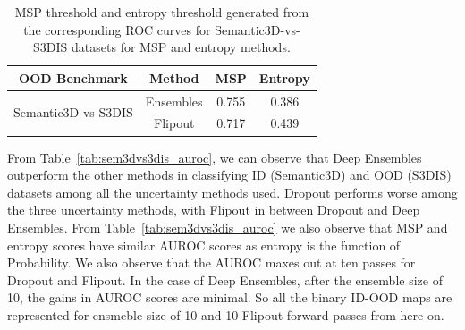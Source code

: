     \begin{table}[h!]
        \centering
        \begin{tabular}{cccc}
            \hline
            OOD Benchmark                                           & Method    & MSP   & Entropy \\ \hline
            \multirow{2}{*}{Semantic3D-vs-S3DIS}                    & Ensembles & 0.755 & 0.386   \\
                                                                    & Flipout   & 0.717 & 0.439   \\ \hline
        \end{tabular}
        \caption{MSP threshold and entropy threshold generated from the corresponding ROC curves for Semantic3D-vs-S3DIS datasets for MSP and entropy methods.}
        \label{tab:thresholds}
    \end{table}
    From Table~\ref{tab:sem3dvs3dis_auroc}, we can observe that Deep Ensembles outperform the other methods in classifying ID (Semantic3D) and OOD (S3DIS) datasets among all the uncertainty methods used.
    Dropout performs worse among the three uncertainty methods, with Flipout in between Dropout and Deep Ensembles.
    From Table~\ref{tab:sem3dvs3dis_auroc} we also observe that MSP and entropy scores have similar AUROC scores as entropy is the function of Probability.
    We also observe that the AUROC maxes out at ten passes for Dropout and Flipout.
    In the case of Deep Ensembles, after the ensemble size of 10, the gains in AUROC scores are minimal.
    So all the binary ID-OOD maps are represented for ensmeble size of 10 and 10 Flipout forward passes  from here on.

